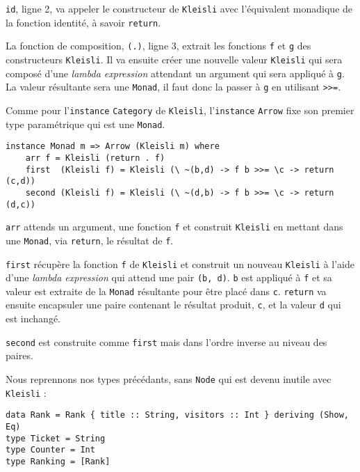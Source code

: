 \documentclass{llncs}
\begin{document}
\lstinline{id}, ligne 2, va appeler le constructeur de \lstinline{Kleisli} avec
l'équivalent monadique de la fonction identité, à savoir \lstinline{return}.

La fonction de composition, \lstinline{(.)}, ligne 3, extrait les fonctions
\lstinline{f} et \lstinline{g} des constructeurs \lstinline{Kleisli}.
Il va ensuite créer une nouvelle valeur \lstinline{Kleisli} qui sera composé d'une
\emph{lambda expression} attendant un argument qui sera appliqué à \lstinline{g}.
La valeur résultante sera une \lstinline{Monad}, il faut donc la passer à \lstinline{g}
en utilisant \lstinline{>>=}.

Comme pour l'\lstinline{instance} \lstinline{Category} de \lstinline{Kleisli},
l'\lstinline{instance} \lstinline{Arrow} fixe son premier type paramétrique qui
est une \lstinline{Monad}.
\begin{lstlisting}
instance Monad m => Arrow (Kleisli m) where
    arr f = Kleisli (return . f)
    first  (Kleisli f) = Kleisli (\ ~(b,d) -> f b >>= \c -> return (c,d))
    second (Kleisli f) = Kleisli (\ ~(d,b) -> f b >>= \c -> return (d,c))
\end{lstlisting}
\lstinline{arr} attends un argument, une fonction \lstinline{f} et construit
\lstinline{Kleisli} en mettant dans une \lstinline{Monad}, via \lstinline{return},
le résultat de \lstinline{f}.

\lstinline{first} récupère la fonction \lstinline{f} de \lstinline{Kleisli} et
construit un nouveau \lstinline{Kleisli} à l'aide d'une \emph{lambda expression}
qui attend une pair \lstinline{(b, d)}.
\lstinline{b} est appliqué à \lstinline{f} et sa valeur est extraite de la
\lstinline{Monad} résultante pour être placé dans \lstinline{c}.
\lstinline{return} va ensuite encapsuler une paire contenant le résultat produit,
\lstinline{c}, et la valeur \lstinline{d} qui est inchangé.

\lstinline{second} est construite comme \lstinline{first} mais dans l'ordre inverse
au niveau des paires.

Nous reprennons nos types précédants, sans \lstinline{Node} qui est devenu
inutile avec \lstinline{Kleisli} :
\begin{lstlisting}
data Rank = Rank { title :: String, visitors :: Int } deriving (Show, Eq)
type Ticket = String
type Counter = Int
type Ranking = [Rank]
\end{lstlisting}
\end{document}
